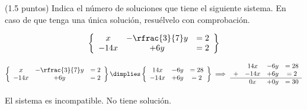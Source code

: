 \documentclass[palatino,nosec]{Docencia}
\begin{document}
\begin{problem}(1.5 puntos) 
Indica el número de soluciones que tiene el siguiente sistema. En caso de que tenga una única solución, resuélvelo con comprobación.

\[
\left\{
	\begin{array}{ccc}
		x&-\rfrac{3}{7}y&=2\\
		-14x&+6y&=2
	\end{array}
\right\}
\]

\solution


\[
\left\{
	\begin{array}{ccc}
		x&-\rfrac{3}{7}y&=2\\
		-14x&+6y&=2
	\end{array}
\right\} \dimplies 
\left\{
	\begin{array}{ccc}
		14x&-6y&=28\\
		-14x&+6y&=2
	\end{array}
\right\} \implies 
\left.
	\begin{array}{lccc}
		 &14x&-6y&=28\\
		+&-14x&+6y&=2\\\hline
		 &0x&+0y&=30
	\end{array}
\right.
\]

El sistema es incompatible. No tiene solución.

\end{problem}
\end{document}
